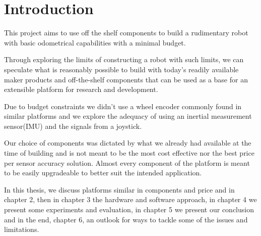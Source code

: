 \documentclass[class=report, crop=false]{standalone}
\begin{document}
\chapter{Introduction}\label{cha:introduction}
\pagestyle{scrheadings}
This project aims to use off the shelf components to build a rudimentary robot with basic odometrical capabilities with a minimal budget.

Through exploring the limits of constructing a robot with such limits, we can speculate what is reasonably possible to build with today's readily available maker products and off-the-shelf components that can be used as a base for an extensible platform for research and development.

Due to budget constraints we didn't use a wheel encoder commonly found in similar platforms and we explore the adequacy of using an inertial measurement sensor(IMU) and the signals from a joystick.

Our choice of components was dictated by what we already had available at the time of building and is not meant to be the most cost effective nor the best price per sensor accuracy solution. Almost every component of the platform is meant to be easily upgradeable to better suit the intended application.

In this thesis, we discuss platforms similar in components and price and in chapter 2, then in chapter 3 the hardware and software approach, in chapter 4 we present some experiments and evaluation, in chapter 5 we present our conclusion and in the end, chapter 6, an outlook for ways to tackle some of the issues and limitations.
\end{document}
